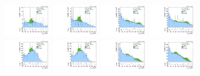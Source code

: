 \begin{figure}[htbp]
  \includegraphics[width=0.18\textwidth]{fig/fitValidation/PostFit_SR_MJJ_MVV1000to1500__mu_HP_vbf_LDy_Run2.pdf}
  \includegraphics[width=0.18\textwidth]{fig/fitValidation/PostFit_SR_MJJ_MVV1000to1500__e_HP_vbf_LDy_Run2.pdf}
  \includegraphics[width=0.18\textwidth]{fig/fitValidation/PostFit_SR_MJJ_MVV1000to1500__mu_LP_vbf_LDy_Run2.pdf}
  \includegraphics[width=0.18\textwidth]{fig/fitValidation/PostFit_SR_MJJ_MVV1000to1500__e_LP_vbf_LDy_Run2.pdf}\\
  \includegraphics[width=0.18\textwidth]{fig/fitValidation/PostFit_SR_MJJ_MVV1000to1500__mu_HP_bb_HDy_Run2.pdf}
  \includegraphics[width=0.18\textwidth]{fig/fitValidation/PostFit_SR_MJJ_MVV1000to1500__e_HP_bb_HDy_Run2.pdf}
  \includegraphics[width=0.18\textwidth]{fig/fitValidation/PostFit_SR_MJJ_MVV1000to1500__mu_LP_bb_HDy_Run2.pdf}
  \includegraphics[width=0.18\textwidth]{fig/fitValidation/PostFit_SR_MJJ_MVV1000to1500__e_LP_bb_HDy_Run2.pdf}\\

\end{figure}
